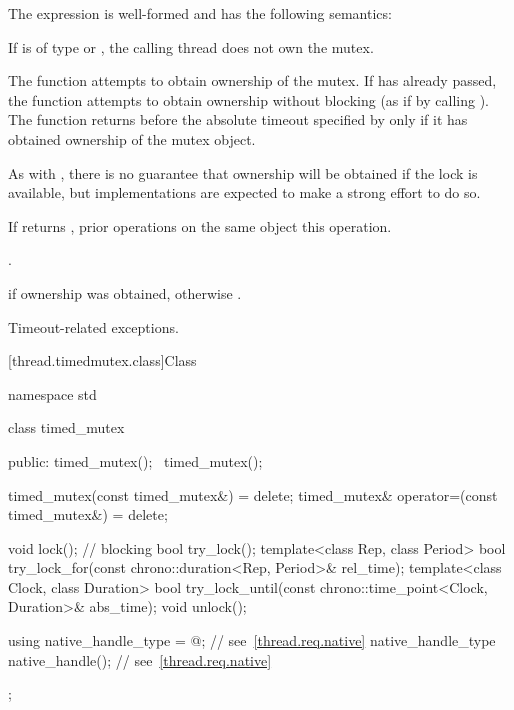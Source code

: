 \pnum
The expression  is well-formed
and has the following semantics:
\begin{itemdescr}
\pnum
\expects
If  is of type  or
, the calling thread does not own the
mutex.

\pnum
\effects
The function attempts to obtain ownership of the mutex. If
 has already passed, the function attempts to obtain ownership
without blocking (as if by calling ). The function
returns before the absolute timeout specified by
 only if it has obtained ownership of the mutex object.
\begin{note}
As with , there is no guarantee that ownership will
be obtained if the lock is available, but implementations are expected to make a
strong effort to do so.
\end{note}

\pnum
\sync
If  returns , prior 
operations on the same object 
this operation.

\pnum
\returntype {}.

\pnum
\returns
{} if ownership was obtained, otherwise .

\pnum
\throws
Timeout-related exceptions.
\end{itemdescr}

[thread.timedmutex.class]{Class }

%
\begin{codeblock}
namespace std {
  class timed_mutex {
  public:
    timed_mutex();
    ~timed_mutex();

    timed_mutex(const timed_mutex&) = delete;
    timed_mutex& operator=(const timed_mutex&) = delete;

    void lock();    // blocking
    bool try_lock();
    template<class Rep, class Period>
      bool try_lock_for(const chrono::duration<Rep, Period>& rel_time);
    template<class Clock, class Duration>
      bool try_lock_until(const chrono::time_point<Clock, Duration>& abs_time);
    void unlock();

    using native_handle_type = @\impdefnc@;          // see~\ref{thread.req.native}
    native_handle_type native_handle();                         // see~\ref{thread.req.native}
  };
}
\end{codeblock}

